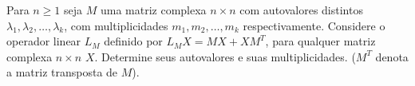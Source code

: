 Para \(n\geq 1\) seja \(M\) uma matriz complexa \(n\times n\) com autovalores distintos \(\lambda_1,\lambda_2,\ldots,\lambda_k\), com multiplicidades \(m_1,m_2,\ldots,m_k\) respectivamente. Considere o operador linear \(L_M\) definido por \(L_MX=MX+XM^T\), para qualquer matriz complexa \(n\times n\) \(X\). Determine seus autovalores e suas multiplicidades. (\(M^T\) denota a matriz transposta de \(M\)).

